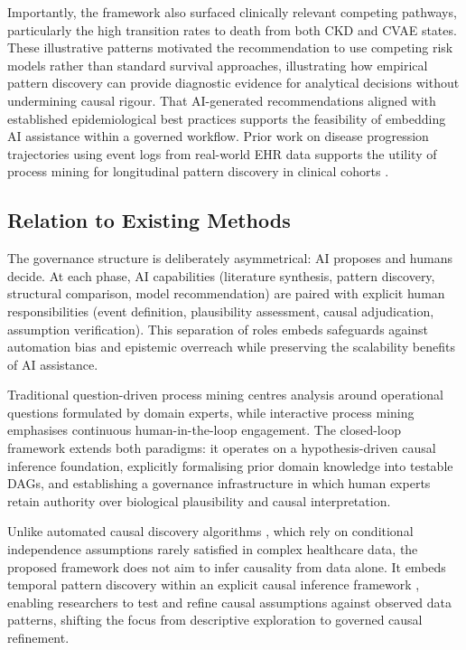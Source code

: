 \documentclass[sn-vancouver-num]{sn-jnl}
\begin{document}
Importantly, the framework also surfaced clinically relevant competing pathways, particularly the high transition rates to death from both CKD and CVAE states. These illustrative patterns motivated the recommendation to use competing risk models rather than standard survival approaches, illustrating how empirical pattern discovery can provide diagnostic evidence for analytical decisions without undermining causal rigour. That AI-generated recommendations aligned with established epidemiological best practices supports the feasibility of embedding AI assistance within a governed workflow. Prior work on disease progression trajectories using event logs from real-world EHR data supports the utility of process mining for longitudinal pattern discovery in clinical cohorts \citep{chen2024b}.

\subsection{Relation to Existing Methods}

The governance structure is deliberately asymmetrical: AI proposes and humans decide. At each phase, AI capabilities (literature synthesis, pattern discovery, structural comparison, model recommendation) are paired with explicit human responsibilities (event definition, plausibility assessment, causal adjudication, assumption verification). This separation of roles embeds safeguards against automation bias and epistemic overreach while preserving the scalability benefits of AI assistance. 

Traditional question-driven process mining \citep{rojas2017} centres analysis around operational questions formulated by domain experts, while interactive process mining \citep{fernandez2020} emphasises continuous human-in-the-loop engagement. The closed-loop framework extends both paradigms: it operates on a hypothesis-driven causal inference foundation, explicitly formalising prior domain knowledge into testable DAGs, and establishing a governance infrastructure in which human experts retain authority over biological plausibility and causal interpretation.

Unlike automated causal discovery algorithms \citep{pearl2009,glymour2019}, which rely on conditional independence assumptions rarely satisfied in complex healthcare data, the proposed framework does not aim to infer causality from data alone. It embeds temporal pattern discovery within an explicit causal inference framework \citep{montoya2025}, enabling researchers to test and refine causal assumptions against observed data patterns, shifting the focus from descriptive exploration to governed causal refinement.
\end{document}
